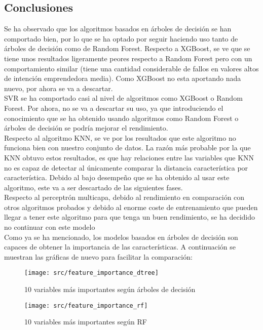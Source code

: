 \subsection{Conclusiones}
Se ha observado que los algoritmos basados en árboles de decisión se han comportado bien, por lo que se ha optado por seguir haciendo uso tanto de árboles de decisión como de Random Forest. Respecto a XGBoost, se ve que se tiene unos resultados ligeramente peores respecto a Random Forest pero con un comportamiento similar (tiene una cantidad considerable de fallos en valores altos de intención emprendedora media). Como XGBoost no esta aportando nada nuevo, por ahora se va a descartar.\\
\linebreak
SVR se ha comportado casi al nivel de algoritmos como XGBoost o Random Forest. Por ahora, no se va a descartar su uso, ya que introduciendo el conocimiento que se ha obtenido usando algoritmos como Random Forest o árboles de decisión se podría mejorar el rendimiento.\\
\linebreak
Respecto al algoritmo KNN,  se ve por los resultados que este algoritmo no funciona bien con nuestro conjunto de datos. La razón más probable por la que KNN obtuvo estos resultados, es que hay relaciones entre las variables que KNN no es capaz de detectar al únicamente comparar la distancia característica por característica. Debido al bajo desempeño que se ha obtenido al usar este algoritmo, este va a ser descartado de las siguientes fases.\\
\linebreak
Respecto al perceptrón multicapa, debido al rendimiento en comparación con otros algoritmos probados y debido al enorme coste de entrenamiento que pueden llegar a tener este algoritmo para que tenga un buen rendimiento, se ha decidido no continuar con este modelo\\
\linebreak
Como ya se ha mencionado, los modelos basados en árboles de decisión son capaces de obtener la importancia de las características. A continuación se muestran las gráficas de nuevo para facilitar la comparación:
\begin{figure}[H]
	\centering
	\texttt{[image: src/feature\_importance\_dtree]}
	\caption{10 variables más importantes según árboles de decisión}
	\label{fig:feature_dtree2}
\end{figure}
\begin{figure}[H]
	\centering
	\texttt{[image: src/feature\_importance\_rf]}
	\caption{10 variables más importantes según RF}
	\label{fig:feature_rf2}
\end{figure}
